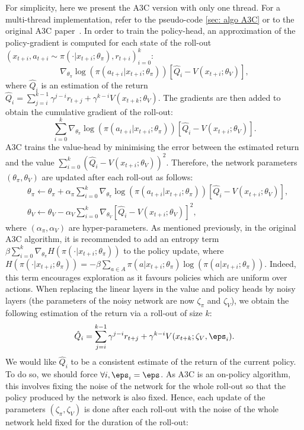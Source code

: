 \documentclass{article}
\begin{document}
For simplicity, here we present the A3C version with only one thread. For a  multi-thread implementation, refer to the pseudo-code \ref{sec: algo A3C} or to the original A3C paper~\citep{mnih2016asynchronous}. In order to train the policy-head, an approximation of the policy-gradient is computed for each state of the roll-out $(x_{t+i},a_{t+i}\sim\pi(\cdot|x_{t+i};\theta_\pi),r_{t+i})_{i=0}^{k}$:
 \begin{equation}
 \nabla_{\theta_\pi}\log(\pi(a_{t+i}|x_{t+i};\theta_\pi))[\hat{Q}_i-V(x_{t+i};\theta_V)],  
 \end{equation}
 where $\hat{Q}_i$ is an estimation of the return $\hat{Q}_i=\sum_{j=i}^{k-1}\gamma^{j-i}r_{t+j}+\gamma^{k-i}V(x_{t+k};\theta_V).$ The gradients are then added to obtain the cumulative gradient of the roll-out:
 \begin{equation}
 \sum_{i=0}^k\nabla_{\theta_\pi}\log(\pi(a_{t+i}|x_{t+i};\theta_\pi))[\hat{Q}_i-V(x_{t+i};\theta_V)].
 \end{equation}
 A3C trains the value-head by minimising the error between the estimated return and the value $\sum_{i=0}^k(\hat{Q}_i-V(x_{t+i};\theta_V))^2$. Therefore, the network parameters $(\theta_\pi,\theta_V)$ are updated after each roll-out as follows:
 \begin{align}
 &\theta_\pi \leftarrow \theta_\pi + \alpha_\pi\sum_{i=0}^k\nabla_{\theta_\pi}\log(\pi(a_{t+i}|x_{t+i};\theta_\pi))[\hat{Q}_i-V(x_{t+i};\theta_V)],
 \\
 &\theta_V \leftarrow \theta_V -\alpha_V\sum_{i=0}^k\nabla_{\theta_V}[\hat{Q}_i-V(x_{t+i};\theta_V)]^2,
 \end{align}
 where $(\alpha_\pi,\alpha_V)$ are hyper-parameters. As mentioned previously, in the original A3C algorithm, it is recommended to add an entropy term $\beta\sum_{i=0}^k\nabla_{\theta_\pi} H(\pi(\cdot|x_{t+i};\theta_\pi))$ to the policy update, where $H(\pi(\cdot|x_{t+i};\theta_\pi))=-\beta\sum_{a\in A}\pi(a|x_{t+i};\theta_\pi)\log(\pi(a|x_{t+i};\theta_\pi))$. Indeed, this term encourages exploration as it favours policies which are uniform over actions. 
 When replacing the linear layers in the value and policy heads by noisy layers (the parameters of the noisy network are now $\zeta_\pi$ and $\zeta_V$), we obtain the following estimation of the return via a roll-out of size $k$:
 \begin{equation}
 \hat{Q}_i=\sum_{j=i}^{k-1}\gamma^{j-i}r_{t+j}+\gamma^{k-i}V(x_{t+k};\zeta_V,\eps_i).
 \end{equation}
 We would like $\hat{Q}_i$ to be a consistent estimate of the return of the current policy. To do so, we should force $\forall i, \eps_i=\eps$. As A3C is an on-policy algorithm, this involves fixing the noise of the network for the whole roll-out so that the policy produced by the network is also fixed. Hence, each update of the parameters $(\zeta_\pi,\zeta_V)$ is done after each roll-out with the noise of the whole network held fixed for the duration of the roll-out:
\end{document}
